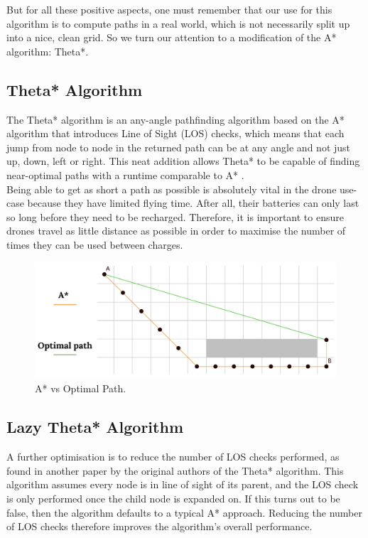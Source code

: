 \documentclass[a4paper,11pt,titlepage]{report}
\begin{document}
\clearpage
But for all these positive aspects, one must remember that our use for this algorithm is to compute paths in a real world, which is not necessarily split up into a nice, clean grid. So we turn our attention to a modification of the A* algorithm: Theta*.

\subsection{Theta* Algorithm}
The Theta* algorithm is an any-angle pathfinding algorithm based on the A* algorithm that introduces Line of Sight (LOS) checks, which means that each jump from node to node in the returned path can be at any angle and not just up, down, left or right. This neat addition allows Theta* to be capable of finding near-optimal paths with a runtime comparable to A* \cite{Uras2015}.\\

Being able to get as short a path as possible is absolutely vital in the drone use-case because they have limited flying time. After all, their batteries can only last so long before they need to be recharged. Therefore, it is important to ensure drones travel as little distance as possible in order to maximise the number of times they can be used between charges.

\begin{figure}[!hbpt]
  \center
  \includegraphics[width=\linewidth]{img/a_star_vs_optimal.png}
  \caption{A* vs Optimal Path. \cite{Balaji2017}}
  \label{fig:a_star_vs_optimal}
\end{figure}

\clearpage
\subsection{Lazy Theta* Algorithm}
A further optimisation is to reduce the number of LOS checks performed, as found in another paper by the original authors of the Theta* algorithm\cite{Nash2010}. This algorithm assumes every node is in line of sight of its parent, and the LOS check is only performed once the child node is expanded on. If this turns out to be false, then the algorithm defaults to a typical A* approach. Reducing the number of LOS checks therefore improves the algorithm's overall performance.
\end{document}
